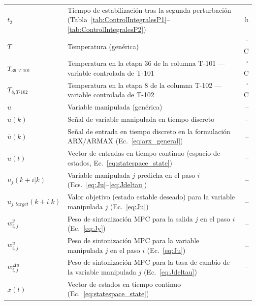 \begin{longtable}{@{} l p{} r @{}}
$t_2$
  & Tiempo de estabilización tras la segunda perturbación (Tabla~\ref{tab:ControlIntegralesP1}--\ref{tab:ControlIntegralesP2})
  & h \\

$T$
  & Temperatura (genérica)
  & $^{\circ}$C \\

$T_{36,T\text{-}101}$
  & Temperatura en la etapa 36 de la columna T-101 — variable controlada de T-101
  & $^{\circ}$C \\

$T_{8,T\text{-}102}$
  & Temperatura en la etapa 8 de la columna T-102 — variable controlada de T-102
  & $^{\circ}$C \\

$u$
  & Variable manipulada (genérica)
  & -- \\

$u(k)$
  & Señal de variable manipulada en tiempo discreto
  & -- \\

$\bar{u}(k)$
  & Señal de entrada en tiempo discreto en la formulación ARX/ARMAX (Ec.~\ref{eq:arx_general})
  & -- \\

$u(t)$
  & Vector de entradas en tiempo continuo (espacio de estados, Ec.~\ref{eq:statespace_state})
  & -- \\

$u_j(k{+}i|k)$
  & Variable manipulada $j$ predicha en el paso $i$ (Ecs.~\ref{eq:Ju}--\ref{eq:Jdeltau})
  & -- \\

$u_{j,target}(k{+}i|k)$
  & Valor objetivo (estado estable deseado) para la variable manipulada $j$ (Ec.~\ref{eq:Ju})
  & -- \\

$w_{i,j}^{y}$
  & Peso de sintonización MPC para la salida $j$ en el paso $i$ (Ec.~\ref{eq:Jy})
  & -- \\

$w_{i,j}^{u}$
  & Peso de sintonización MPC para la variable manipulada $j$ en el paso $i$ (Ec.~\ref{eq:Ju})
  & -- \\

$w_{i,j}^{\Delta u}$
  & Peso de sintonización MPC para la tasa de cambio de la variable manipulada $j$ (Ec.~\ref{eq:Jdeltau})
  & -- \\

$x(t)$
  & Vector de estados en tiempo continuo (Ec.~\ref{eq:statespace_state})
  & -- \\


\end{longtable}
